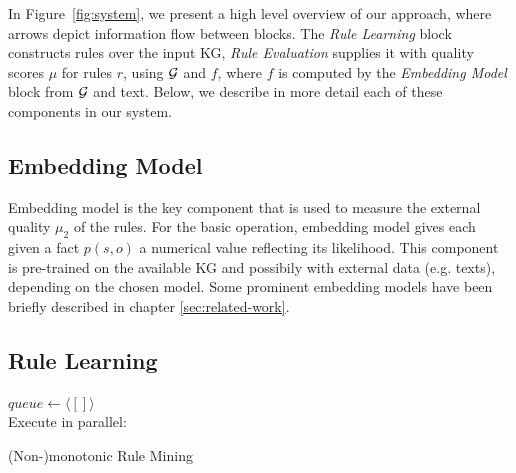 In Figure~\ref{fig:system}, we present a high level overview of our approach, where arrows depict information flow between blocks.
The \emph{Rule Learning} block constructs rules over the input KG, \emph{Rule Evaluation} supplies it with quality scores $\mu$ for rules $r$, using $\mathcal{G}$ and $f$, where $f$ is computed by the \emph{Embedding Model} block from $\mathcal{G}$ and text. Below, we describe in more detail each of these components in our system.

\subsection{Embedding Model} 
Embedding model is the key component that is used to measure the external quality $\mu_2$ of the rules. For the basic operation, embedding model gives each given a fact $p(s,o)$ a numerical value reflecting its likelihood. This component is pre-trained on the available KG and possibily with external data (e.g. texts), depending on the chosen model. Some prominent embedding models have been briefly described in chapter \ref{sec:related-work}.

\subsection{Rule Learning} 
\begin{algorithm}[t]
\DontPrintSemicolon
$queue\leftarrow \langle[]\rangle$\\
Execute in parallel:\\
\caption{(Non-)monotonic Rule Mining}
\label{algor:mining}
\end{algorithm}


